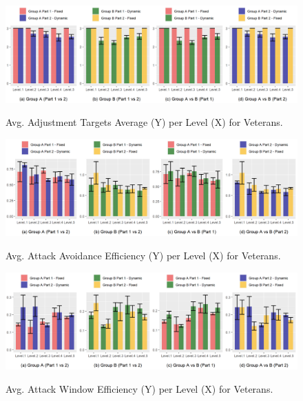 \begin{figure}[!ht]
    \begin{center}
    \caption{Avg. Adjustment Targets Average (Y) per Level (X) for Veterans.}
        \includegraphics[width=\textwidth]{figures/adjustment_target_level-veteran_players.png}
    \label{fig:result-metric-veteran-adjustment-target-level}
    \end{center}
\end{figure}

\begin{figure}[!ht]
    \begin{center}
        \caption{Avg. Attack Avoidance Efficiency (Y) per Level (X) for Veterans.}
        \includegraphics[width=\textwidth]{figures/attack_avoidance_efficiency-veteran_players.png}
    \label{fig:result-metric-veterans-attack-avoidance-efficiency}
    \end{center}
\end{figure}

\begin{figure}[!ht]
    \begin{center}
    \caption{Avg. Attack Window Efficiency (Y) per Level (X) for Veterans.}
        \includegraphics[width=\textwidth]{figures/attack_window_efficiency-veteran_players.png}
    \label{fig:result-metric-veterans-attack-window-efficiency}
    \end{center}
\end{figure}

